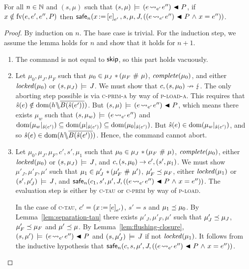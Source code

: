 \documentclass[11pt]{report}
\begin{document}
\begin{lemma}
	\label{lem:load-safe}
	For all $n \in \mathbb{N}$ and $(s,\mu)$ such that $(s,\mu) \,\models\, (e \!\leadsto_{e'}\! e'') \operatorname{\,\blacktriangleleft\,} P$, if $x \notin \mathrm{fv}(e,e',e'',P)$ then $\mathsf{safe}_{n}(x \operatorname{:\!=} \left[ e \right]_{e'},s,\mu,J,\left((e \!\leadsto_{e'}\! e'') \operatorname{\,\blacktriangleleft\,} P \operatorname{\,\wedge\,} x = e''\right))$. 
\end{lemma}

\begin{proof}
	By induction on $n$. The base case is trivial. For the induction step, we assume the lemma holds for $n$ and show that it holds for $n+1$.

	\begin{enumerate}
		\item The command is not equal to $\operatorname{\mathsf{skip}}$, so this part holds vacuously. 

		\item Let $\mu_0,\mu_J,\mu_F$ such that $\mu_0 \in \mu_J \operatorname{\,\ast\,} (\mu_F \operatorname{\,\#\,} \mu)$, $\mathit{complete}(\mu_0)$, and either $\mathit{locked}(\mu_0)$ or $(s,\mu_J) \,\models\, J$. We must show that $c,(s,\mu_0) \nrightarrow \lightning$. The only aborting step possible is via \textsc{c-prim-a} by way of \textsc{p-load-a}. This requires that $\hat{s}(e) \notin \operatorname{\mathrm{dom}}(h \backslash\!\!\backslash \overline{B(\hat{s}(e'))})$. But $(s,\mu) \,\models\, (e \!\leadsto_{e'}\! e'') \operatorname{\,\blacktriangleleft\,} P$, which means there exists $\mu_w$ such that $(s,\mu_w) \,\models\, (e \!\leadsto_{e'}\! e'')$ and $\operatorname{\mathrm{dom}}(\mu_w |_{\hat{s}(e')}) \subseteq \operatorname{\mathrm{dom}}(\mu |_{\hat{s}(e')}) \subseteq \operatorname{\mathrm{dom}}(\mu_0 |_{\hat{s}(e')})$. But $\hat{s}(e) \in \operatorname{\mathrm{dom}}(\mu_w |_{\hat{s}(e')})$, and so $\hat{s}(e) \in \operatorname{\mathrm{dom}}(h \backslash\!\!\backslash \overline{B(\hat{s}(e'))})$. Hence, the command cannot abort. 

		\item Let $\mu_0,\mu_J,\mu_F,c',s',\mu_1$ such that $\mu_0 \in \mu_J \operatorname{\,\ast\,} (\mu_F \operatorname{\,\#\,} \mu)$, $\mathit{complete}(\mu_0)$, either $\mathit{locked}(\mu_0)$ or $(s,\mu_J) \,\models\, J$, and $c,(s,\mu_0) \rightarrow c',(s',\mu_1)$. We must show $\mu'_J,\mu'_F,\mu'$ such that $\mu_1 \in \mu'_J \operatorname{\,\ast\,} (\mu'_F \operatorname{\,\#\,} \mu')$, $\mu'_F \preceq \mu_F$, either $\mathit{locked}(\mu_1)$ or $(s',\mu'_J) \,\models\, J$, and $\mathsf{safe}_{n}(c_1,s',\mu',J,((e \!\leadsto_{e'}\! e'') \operatorname{\,\blacktriangleleft\,} P \operatorname{\,\wedge\,} x = e''))$. The evaluation step is either by \textsc{c-tau} or \textsc{c-prim} by way of \textsc{p-load}. 

		In the case of \textsc{c-tau}, $c' = (x \operatorname{:\!=} \left[ e \right]_{e'})$, $s' = s$ and $\mu_1 \preceq \mu_0$. By Lemma~\ref{lem:separation-tau} there exists $\mu'_J,\mu'_F,\mu'$ such that $\mu'_J \preceq \mu_J$, $\mu'_F \preceq \mu_F$ and $\mu' \preceq \mu$. By Lemma~\ref{lem:flushing-closure}, $(s,\mu') \,\models\, (e \!\leadsto_{e'}\! e'') \operatorname{\,\blacktriangleleft\,} P$ and $(s,\mu'_J) \,\models\, J$ if not $\mathit{locked}(\mu_1)$. It follows from the inductive hypothesis that $\mathsf{safe}_{n}(c,s,\mu',J,((e \!\leadsto_{e'}\! e'') \operatorname{\,\blacktriangleleft\,} P \operatorname{\,\wedge\,} x = e''))$. 


\end{enumerate}
\end{proof}
\end{document}
